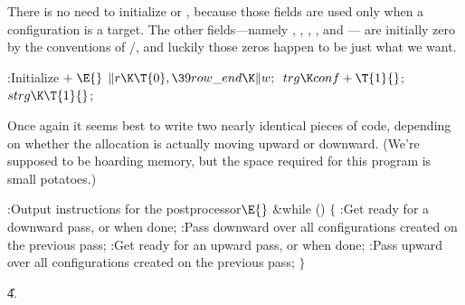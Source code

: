 There is no need to initialize  or , because
those fields are used only when a configuration is a target.
The other fields---namely , , ,
, and --- are
initially zero by the
conventions of \CEE/, and luckily those zeros happen to be just what we want.

\Y\B\4:Initialize\X${}\mathrel+\E{}$\6
$\|r\K\T{0},\39\\{row\_end}\K\|w;{}$\6
${}\\{trg}\K\\{conf}+\T{1}{}$;\6
${}\\{strg}\K\T{1}{}$;\par
\fi

Once again it seems best to write two nearly identical pieces of
code, depending on whether the allocation is actually moving upward or
downward. (We're supposed to be hoarding memory, but the space required
for this program is small potatoes.)

\Y\B\4:Output instructions for the postprocessor\X${}\E{}$\6
\&{while} ()\5
${}\{{}$\1\6
:Get ready for a downward pass, or  when done\X;\6
:Pass downward over all configurations created on the previous pass\X;\6
:Get ready for an upward pass, or  when done\X;\6
:Pass upward over all configurations created on the previous pass\X;\6
\4${}\}{}$\2\par
\U4.\fi

